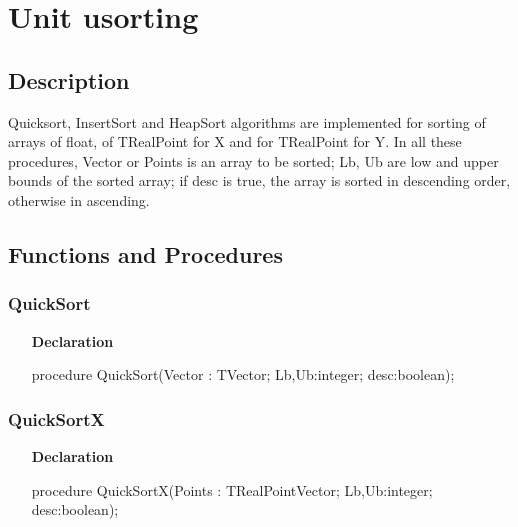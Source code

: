 \documentclass[12pt,a4paper,oneside]{report}
\newcommand{\lmath}[1]{   %
	\marginpar{\vspace{#1} 
		\begin{flushright}
			LMath
	\end{flushright} }
}
\newcommand{\declarationitem}[1]{\textbf{#1}}
\begin{document}
\section{Unit usorting}\lmath{-24pt}
\label{usorting}
\subsection{Description}
Quicksort, InsertSort and HeapSort algorithms are implemented for sorting of arrays of float, of TRealPoint for X and for TRealPoint for Y. In all these procedures, Vector or Points is an array to be sorted; Lb, Ub are low and upper bounds of the sorted array; if desc is true, the array is sorted in descending order, otherwise in ascending.
\subsection{Functions and Procedures}
\subsubsection{QuickSort}
\label{lmsorting-QuickSort}
\begin{itemize}\item[\declarationitem{Declaration}\hfill]
	\begin{flushleft}
		\begin{ttfamily}
			procedure QuickSort(Vector : TVector; Lb,Ub:integer; desc:boolean);\end{ttfamily}
		
	\end{flushleft}
	
\end{itemize}
\subsubsection{QuickSortX}
\label{lmsorting-QuickSortX}
\begin{itemize}\item[\declarationitem{Declaration}\hfill]
	\begin{flushleft}
		\begin{ttfamily}
			procedure QuickSortX(Points : TRealPointVector; Lb,Ub:integer; desc:boolean);\end{ttfamily}
		
	\end{flushleft}
	
\end{itemize}
\end{document}
